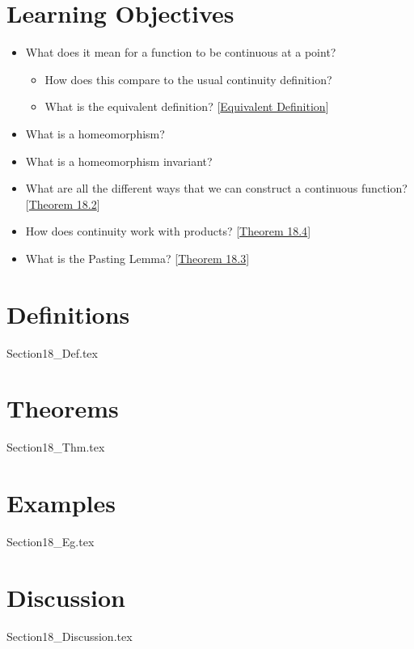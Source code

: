 \section{Learning Objectives}

\begin{itemize}
    \item What does it mean for a function to be continuous at a point?
        \begin{itemize}
            \item How does this compare to the usual continuity definition?
            \item What is the equivalent definition? 
                [\hyperlink{thm:18.0-2}{Equivalent Definition}]
        \end{itemize}
    \item What is a homeomorphism?
    \item What is a homeomorphism invariant?
    \item What are all the different ways that we can construct a continuous 
        function? [\hyperlink{thm:18.2}{Theorem 18.2}]
    \item How does continuity work with products? 
        [\hyperlink{thm:18.4}{Theorem 18.4}]
    \item What is the Pasting Lemma? [\hyperlink{thm:18.3}{Theorem 18.3}]
\end{itemize}

\section{Definitions}

{Section18_Def.tex}

\section{Theorems}

{Section18_Thm.tex}

\section{Examples}

{Section18_Eg.tex}

\section{Discussion}

{Section18_Discussion.tex}